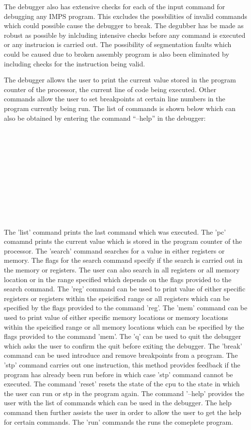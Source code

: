 \documentclass[12pt,a4paper,oneside]{report}
\begin{document}
The debugger also has extensive checks for each of the input command for debugging  any IMPS program. This excludes the possbilities of invalid commands which could possible cause the debugger to break. The degubber has be made as robust as possible by inlcluding intensive checks before any command is executed or any instrucion is carried out. The possibility of segmentation faults which could be caused due to  broken assembly program is also been eliminated by including checks for the instruction being valid. 

The debugger allows the user to print the current value stored in the program counter of the processor, the current line of code being executed. Other commands allow the user to set breakpoints at certain line numbers in the program currently being run. The list of commands is shown below which can also be obtained by entering the command “--help” in the debugger:\\
 \\
\\
\\
\\
\\
\\
\\
\\
\\
\\
\\
The 'list' command prints the last command which was executed. The 'pc' comamnd prints the current value which is stored in the program counter of the processor. The 'search' command searches for a value in either registers or memory. The flags for the search command specify if the search is carried out in the memory or registers. The user can also search in all registers or all memory location or in the range specified which depends on the flags provided to the search command. The 'reg' command can be used to print value of either specific registers or registers within the speicified range or all registers which can be specified by the flags provided to the command 'reg'. The 'mem' command can be used to print value of either specific memory locations or memory locations within the speicified range or all memory locations which can be specified by the flags provided to the command 'mem'. The 'q' can be used to quit the debugger which asks the user to confirm the quit before exiting the debugger. The 'break' command can be used introduce and remove breakpoints from a  program. The 'stp' command carries out one instruction, this method provides feedback if the program has already been run before in which case 'stp' command cannot be executed. The command 'reset' resets the state of the cpu to the state in which the user can run or stp in the program again. The command '--help' provides the user with the list of commands which can be used in the debugger. The help command then further assists the user in order to allow the user to get the help for certain commands. The 'run' commands the runs the comeplete program.
\end{document}
